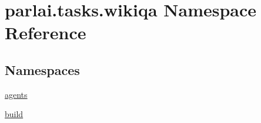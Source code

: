 \hypertarget{namespaceparlai_1_1tasks_1_1wikiqa}{}\section{parlai.\+tasks.\+wikiqa Namespace Reference}
\label{namespaceparlai_1_1tasks_1_1wikiqa}
\subsection*{Namespaces}
\begin{DoxyCompactItemize}
\item 
 \hyperlink{namespaceparlai_1_1tasks_1_1wikiqa_1_1agents}{agents}
\item 
 \hyperlink{namespaceparlai_1_1tasks_1_1wikiqa_1_1build}{build}
\end{DoxyCompactItemize}

